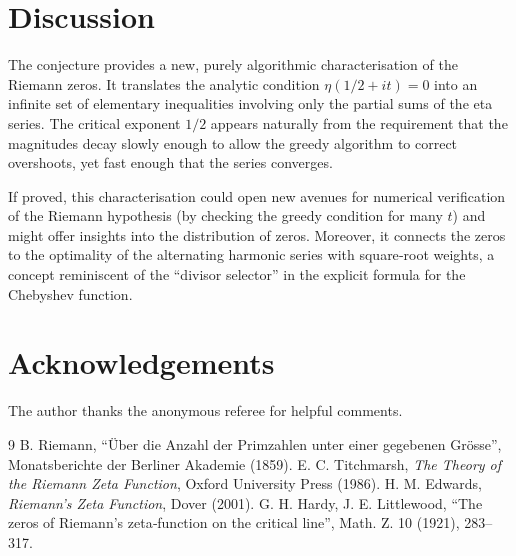 \documentclass[12pt,a4paper]{article}
\begin{document}
\section{Discussion}

The conjecture provides a new, purely algorithmic characterisation of the Riemann zeros. It translates the analytic condition $\eta(1/2+it)=0$ into an infinite set of elementary inequalities involving only the partial sums of the eta series. The critical exponent $1/2$ appears naturally from the requirement that the magnitudes decay slowly enough to allow the greedy algorithm to correct overshoots, yet fast enough that the series converges.

If proved, this characterisation could open new avenues for numerical verification of the Riemann hypothesis (by checking the greedy condition for many $t$) and might offer insights into the distribution of zeros. Moreover, it connects the zeros to the optimality of the alternating harmonic series with square‑root weights, a concept reminiscent of the “divisor selector” in the explicit formula for the Chebyshev function.

\section*{Acknowledgements}
The author thanks the anonymous referee for helpful comments.

\begin{thebibliography}{9}
 B. Riemann, ``Über die Anzahl der Primzahlen unter einer gegebenen Grösse'', Monatsberichte der Berliner Akademie (1859).
 E. C. Titchmarsh, \textit{The Theory of the Riemann Zeta Function}, Oxford University Press (1986).
 H. M. Edwards, \textit{Riemann's Zeta Function}, Dover (2001).
 G. H. Hardy, J. E. Littlewood, ``The zeros of Riemann's zeta‐function on the critical line'', Math. Z. 10 (1921), 283–317.
\end{thebibliography}
\end{document}
